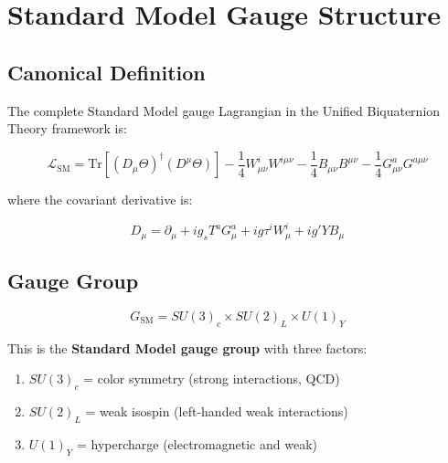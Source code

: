 

\section{Standard Model Gauge Structure}
\label{sec:canonical:sm_gauge}

\subsection{Canonical Definition}

The complete Standard Model gauge Lagrangian in the Unified Biquaternion Theory framework is:

\begin{equation}
\label{eq:canonical:sm_lagrangian}
\boxed{\mathcal{L}_{\text{SM}} = \text{Tr}\left[(D_\mu\Theta)^\dagger (D^\mu\Theta)\right] - \frac{1}{4}W^i_{\mu\nu}W^{i\mu\nu} - \frac{1}{4}B_{\mu\nu}B^{\mu\nu} - \frac{1}{4}G^a_{\mu\nu}G^{a\mu\nu}}
\end{equation}

\noindent where the covariant derivative is:

\begin{equation}
\label{eq:canonical:sm_covariant}
D_\mu = \partial_\mu + ig_s T^a G^a_\mu + ig \tau^i W^i_\mu + ig' Y B_\mu
\end{equation}

\subsection{Gauge Group}

\begin{equation}
\label{eq:canonical:sm_group}
\boxed{G_{\text{SM}} = SU(3)_c \times SU(2)_L \times U(1)_Y}
\end{equation}

This is the \textbf{Standard Model gauge group} with three factors:

\begin{enumerate}
    \item $SU(3)_c$ = color symmetry (strong interactions, QCD)
    \item $SU(2)_L$ = weak isospin (left-handed weak interactions)
    \item $U(1)_Y$ = hypercharge (electromagnetic and weak)
\end{enumerate}

